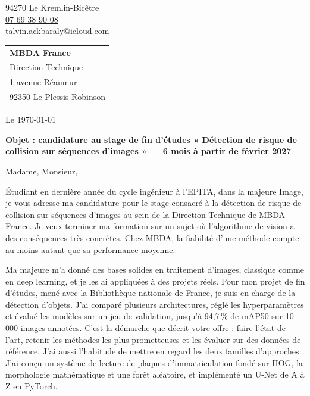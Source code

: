 \documentclass[11pt, a4paper]{extarticle}
\begin{document}
{\color{accent}\fontsize{22}{26}\selectfont\scshape{}}\par\vspace{3pt}
{\setlength{\parskip}{0pt}
94270 Le Kremlin-Bicêtre\\
\href{tel:+33769389008}{\textcolor{ink}{07 69 38 90 08}}\\
\href{mailto:talvin.ackbaraly@icloud.com}{\textcolor{ink}{talvin.ackbaraly@icloud.com}}\par}
\vspace{-4pt}{\color{hair}\rule{\textwidth}{0.4pt}}\par

\vspace{2pt}
\hfill\begin{tabular}[t]{@{}l@{}}
  \textbf{MBDA France}\\
  Direction Technique\\
  1 avenue Réaumur\\
  92350 Le Plessis-Robinson
\end{tabular}

Le \today

\vspace{2pt}
\textbf{Objet : candidature au stage de fin d'études « Détection de risque de collision sur
séquences d'images » — 6 mois à partir de février 2027}

\vspace{2pt}
Madame, Monsieur,

\justifying
Étudiant en dernière année du cycle ingénieur à l'EPITA, dans la majeure Image, je vous adresse
ma candidature pour le stage consacré à la détection de risque de collision sur séquences d'images
au sein de la Direction Technique de MBDA France. Je veux terminer ma formation sur un sujet où
l'algorithme de vision a des conséquences très concrètes. Chez MBDA, la fiabilité d'une méthode
compte au moins autant que sa performance moyenne.

Ma majeure m'a donné des bases solides en traitement d'images, classique comme en deep learning,
et je les ai appliquées à des projets réels. Pour mon projet de fin d'études, mené avec la
Bibliothèque nationale de France, je suis en charge de la détection d'objets. J'ai comparé
plusieurs architectures, réglé les hyperparamètres et évalué les modèles sur un jeu de
validation, jusqu'à 94,7\,\% de mAP50 sur 10\,000 images annotées. C'est la démarche que décrit
votre offre : faire l'état de l'art, retenir les méthodes les plus prometteuses et les évaluer
sur des données de référence. J'ai aussi l'habitude de mettre en regard les deux familles
d'approches. J'ai conçu un système de lecture de plaques d'immatriculation fondé sur HOG, la
morphologie mathématique et une forêt aléatoire, et implémenté un U-Net de A à Z en PyTorch.
\end{document}
